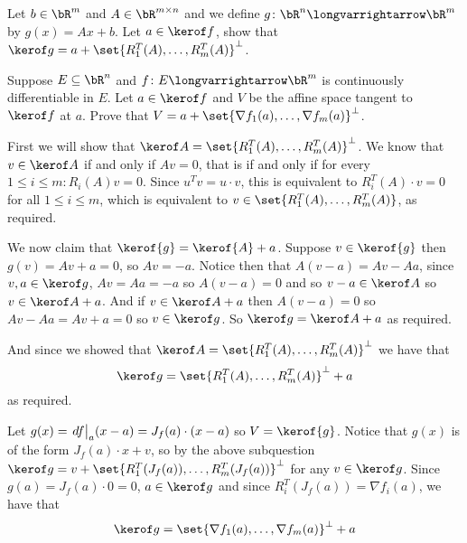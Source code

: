 \documentclass[10pt]{article}
\def\differ#1#2{\left.d#1\strut\right|_{#2}}
\begin{document}


\bigskip

\begin{exercise*}

    \benum
        \item Let $b\in\bR^m$ and $A\in\bR^{m\times n}$ and we define $g\colon\bR^n\longvarrightarrow\bR^m$ by $g(x)=Ax+b$.
        Let $a\in\kerof f$, show that $\kerof g=a+\set{R_1^T(A),\dots,R_m^T(A)}^\bot$.
        \item Suppose $E\subseteq\bR^n$  and $f\colon E\longvarrightarrow\bR^m$ is continuously differentiable in $E$.
        Let $a\in\kerof f$ and $V$ be the affine space tangent to $\kerof f$ at $a$.
        Prove that $V=a+\set{\nabla f_1(a),\dots,\nabla f_m(a)}^\bot$.
    \eenum

\end{exercise*}

\begin{blankpp}

    \benum
        \item First we will show that $\kerof A=\set{R_1^T(A),\dots,R_m^T(A)}^\bot$.
        We know that $v\in\kerof A$ if and only if $Av=0$, that is if and only if for every $1\leq i\leq m: R_i(A)v=0$.
        Since $u^Tv=u\cdot v$, this is equivalent to $R_i^T(A)\cdot v=0$ for all $1\leq i\leq m$, which is equivalent to $v\in\set{R_1^T(A),\dots,R_m^T(A)}$, as required.

        We now claim that $\kerof{g}=\kerof{A}+a$.
        Suppose $v\in\kerof{g}$ then $g(v)=Av+a=0$, so $Av=-a$.
        Notice then that $A(v-a)=Av-Aa$, since $v,a\in\kerof g$, $Av=Aa=-a$ so $A(v-a)=0$ and so $v-a\in\kerof A$ so $v\in\kerof A+a$.
        And if $v\in\kerof A+a$ then $A(v-a)=0$ so $Av-Aa=Av+a=0$ so $v\in\kerof g$.
        So $\kerof g=\kerof A+a$ as required.

        And since we showed that $\kerof A=\set{R_1^T(A),\dots,R_m^T(A)}^\bot$ we have that
        \[ \kerof g = \set{R_1^T(A),\dots,R_m^T(A)}^\bot + a \]
        as required.

        \item Let $g(x)=\differ fa(x-a)=J_f(a)\cdot(x-a)$ so $V=\kerof{g}$.
        Notice that $g(x)$ is of the form $J_f(a)\cdot x+v$, so by the above subquestion $\kerof g=v+\set{R_1^T(J_f(a)),\dots,R_m^T(J_f(a))}^\bot$ for any $v\in\kerof g$.
        Since $g(a)=J_f(a)\cdot0=0$, $a\in\kerof g$ and since $R_i^T(J_f(a))=\nabla f_i(a)$, we have that
        \[ \kerof g = \set{\nabla f_1(a),\dots,\nabla f_m(a)}^\bot + a \]

    \eenum

\end{blankpp}
\end{document}
